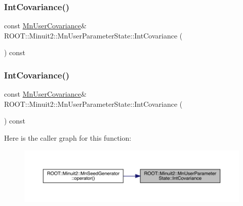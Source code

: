 \subsubsection{\texorpdfstring{IntCovariance()}{IntCovariance()}\hspace{0.1cm}{\footnotesize\ttfamily [1/3]}}
{\footnotesize\ttfamily const \mbox{\hyperlink{classROOT_1_1Minuit2_1_1MnUserCovariance}{Mn\+User\+Covariance}}\& R\+O\+O\+T\+::\+Minuit2\+::\+Mn\+User\+Parameter\+State\+::\+Int\+Covariance (\begin{DoxyParamCaption}{ }\end{DoxyParamCaption}) const\hspace{0.3cm}{\ttfamily [inline]}}

\mbox{\label{classROOT_1_1Minuit2_1_1MnUserParameterState_ad4b67f98845868977a7b7d99c8ffbe2d}} 
\subsubsection{\texorpdfstring{IntCovariance()}{IntCovariance()}\hspace{0.1cm}{\footnotesize\ttfamily [2/3]}}
{\footnotesize\ttfamily const \mbox{\hyperlink{classROOT_1_1Minuit2_1_1MnUserCovariance}{Mn\+User\+Covariance}}\& R\+O\+O\+T\+::\+Minuit2\+::\+Mn\+User\+Parameter\+State\+::\+Int\+Covariance (\begin{DoxyParamCaption}{ }\end{DoxyParamCaption}) const\hspace{0.3cm}{\ttfamily [inline]}}

Here is the caller graph for this function\+:
\nopagebreak
\begin{figure}[H]
\begin{center}
\leavevmode
\includegraphics[width=350pt]{d3/de0/classROOT_1_1Minuit2_1_1MnUserParameterState_ad4b67f98845868977a7b7d99c8ffbe2d_icgraph}
\end{center}
\end{figure}
\mbox{\label{classROOT_1_1Minuit2_1_1MnUserParameterState_ad4b67f98845868977a7b7d99c8ffbe2d}} 
